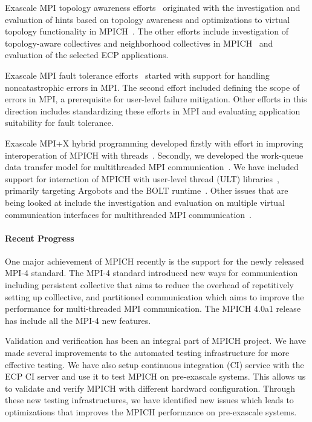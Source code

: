 Exascale MPI topology awareness efforts~\cite{Topo1,Topo2} originated
with the investigation and evaluation of hints based on topology
awareness and optimizations to virtual topology functionality in
MPICH~\cite{topo-io,topo-io2}. The other efforts include investigation
of topology-aware collectives and neighborhood collectives in
MPICH~\cite{coll} and evaluation of the selected ECP applications.

Exascale MPI fault tolerance efforts~\cite{FT1, FT2} started with
support for handling noncatastrophic errors in MPI. The second effort
included defining the scope of errors in MPI, a prerequisite for
user-level failure mitigation. Other efforts in this direction
includes standardizing these efforts in MPI and evaluating application
suitability for fault tolerance.

Exascale MPI+X hybrid programming developed firstly with effort in
improving interoperation of MPICH with threads~\cite{interthread}.
Secondly, we developed the work-queue data transfer model for
multithreaded MPI communication~\cite{workq}. We have included support
for interaction of MPICH with user-level thread (ULT)
libraries~\cite{ULT}, primarily targeting Argobots and the BOLT
runtime~\cite{BOLT}.  Other issues that are being looked at include the
investigation and evaluation on multiple virtual communication
interfaces for multithreaded MPI communication~\cite{VCI}.

\paragraph{Recent Progress}

One major achievement of MPICH recently is the support for the newly
released MPI-4 standard. The MPI-4 standard introduced new ways for
communication including persistent collective that aims to reduce the
overhead of repetitively setting up colllective, and partitioned
communication which aims to improve the performance for multi-threaded
MPI communication. The MPICH 4.0a1 release has include all the MPI-4 new
features.

Validation and verification has been an integral part of MPICH project.
We have made several improvements to the automated testing
infrastructure for more effective testing. We have also setup continuous
integration (CI) service with the ECP CI server and use it to test MPICH
on pre-exascale systems. This allows us to validate and verify MPICH
with different hardward configuration. Through these new testing
infrastructures, we have identified new issues which leads to
optimizations that improves the MPICH performance on pre-exascale
systems.

